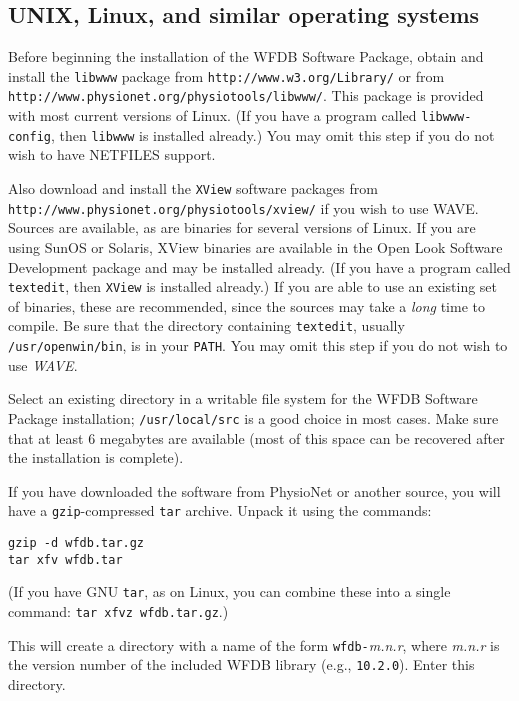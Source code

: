 \documentclass[twoside]{article}
\begin{document}
\subsection*{UNIX, Linux, and similar operating systems}

Before beginning the installation of the WFDB Software Package, obtain and
install the {\tt libwww} package from {\tt http://www.w3.org/Library/} or
from {\tt http://\-www.physio\-net.org/physio\-tools/libwww/}.  This package is
provided with most current versions of Linux.  (If you have a program called
{\tt libwww-config}, then {\tt libwww} is installed already.)  You may
omit this step if you do not wish to have NETFILES support.

Also download and install the {\tt XView} software packages from {\tt
http://www.\-physio\-net.org/\-physio\-tools/xview/} if you wish to use WAVE.
Sources are available, as are binaries for several versions of Linux.  If you
are using SunOS or Solaris, XView binaries are available in the Open Look
Software Development package and may be installed already.  (If you have a
program called {\tt textedit}, then {\tt XView} is installed already.) If you
are able to use an existing set of binaries, these are recommended, since the
sources may take a {\em long} time to compile.  Be sure that the directory
containing {\tt textedit}, usually {\tt /usr/openwin/bin}, is in your
{\tt PATH}.  You may omit this step if you do not wish to use {\em WAVE}.

Select an existing directory in a writable file system for the WFDB Software
Package installation; {\tt /usr/local/src} is a good choice in most cases.
Make sure that at least 6 megabytes are available (most of this space can be
recovered after the installation is complete).

If you have downloaded the software from PhysioNet or another source, you
will have a {\tt gzip}-compressed {\tt tar} archive.  Unpack it using
the commands:

\begin{verbatim}
gzip -d wfdb.tar.gz
tar xfv wfdb.tar
\end{verbatim}

(If you have GNU {\tt tar}, as on Linux, you can combine these into a
single command: {\tt tar xfvz wfdb.tar.gz}.)

This will create a directory with a name of the form {\tt wfdb-}{\em m.n.r},
where {\em m.n.r} is the version number of the included WFDB library (e.g.,
{\tt 10.2.0}).  Enter this directory.
\end{document}
